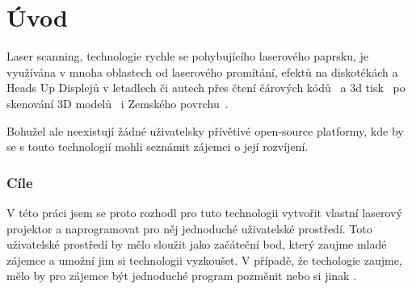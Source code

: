 \chapter*{Úvod}
Laser scanning, technologie rychle se pohybujícího laserového paprsku, je využívána v mnoha oblastech od laserového promítání, efektů na diskotékách a Heads Up Displejů v letadlech či autech \cite{huds-in-driving} přes čtení čárových kódů~\cite{history-of-barcode-scanning} a 3d tisk~\cite{Photo-curing-3D-printing} po skenování 3D modelů~\cite{3d-model-scan} i Zemského povrchu~\cite{heightmaps}.

Bohužel ale neexistují žádné uživatelsky přívětivé open-source platformy, kde by se s touto technologií mohli seznámit zájemci o její rozvíjení.

\subsection*{Cíle}
V této práci jsem se proto rozhodl pro tuto technologii vytvořit vlastní laserový projektor a naprogramovat pro něj jednoduché uživatelské prostředí.
Toto uživatelské prostředí by mělo sloužit jako začáteční bod, který zaujme mladé zájemce a umožní jim si technologii vyzkoušet.
V případě, že techologie zaujme, mělo by pro zájemce být jednoduché program pozměnit nebo si jinak .
